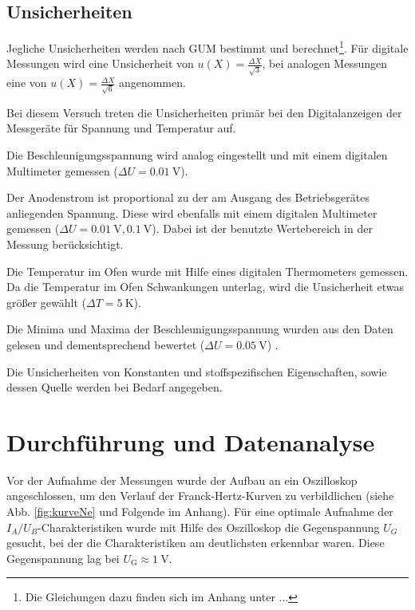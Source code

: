 	\subsection{Unsicherheiten}
	
		Jegliche Unsicherheiten werden nach GUM bestimmt und berechnet\footnote{Die Gleichungen dazu finden sich im Anhang unter ... }. %
		Für digitale Messungen wird eine Unsicherheit von $u(X) = \frac{\Delta X}{\sqrt{3}}$, bei analogen Messungen eine von $u(X) = \frac{\Delta X}{\sqrt{6}}$ angenommen.
	
		Bei diesem Versuch treten die Unsicherheiten primär bei den Digitalanzeigen der Messgeräte für Spannung und Temperatur auf.
		
		Die Beschleunigungsspannung wird analog eingestellt und mit einem digitalen Multimeter gemessen ($\Delta U = \SI{0.01}{\volt}$).
	
		Der Anodenstrom ist proportional zu der am Ausgang des Betriebsgerätes anliegenden Spannung.
		Diese wird ebenfalls mit einem digitalen Multimeter gemessen ($\Delta U = \SI{0.01}{\volt}, \SI{0.1}{\volt}$).
		Dabei ist der benutzte Wertebereich in der Messung berücksichtigt.
		
		Die Temperatur im Ofen wurde mit Hilfe eines digitalen Thermometers gemessen.
		Da die Temperatur im Ofen Schwankungen unterlag, wird die Unsicherheit etwas größer gewählt ($\Delta T = \SI{5}{\kelvin}$).
		
		Die Minima und Maxima der Beschleunigungsspannung wurden aus den Daten gelesen und dementsprechend bewertet ($\Delta U = \SI{0.05}{\volt}$) .
		
		Die Unsicherheiten von Konstanten und stoffspezifischen Eigenschaften, sowie dessen Quelle werden bei Bedarf angegeben.

\section{Durchführung und Datenanalyse}
	
	Vor der Aufnahme der Messungen wurde der Aufbau an ein Oszilloskop angeschlossen, um den Verlauf der Franck-Hertz-Kurven zu verbildlichen (siehe Abb. \ref{fig:kurveNe} und Folgende im Anhang).
	Für eine optimale Aufnahme der $I_A/U_B$-Charakteristiken wurde mit Hilfe des Oszilloskop die Gegenspannung $U_G$ gesucht, bei der die Charakteristiken am deutlichsten erkennbar waren.
	Diese Gegenspannung lag bei $ U_\text{G} \approx \SI{1}{\volt}$.
	
